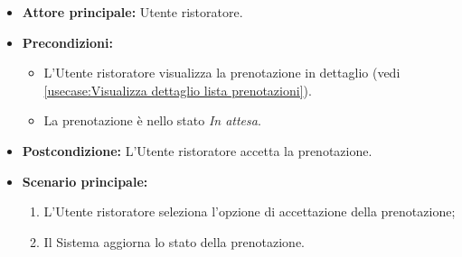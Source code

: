 \label{usecase:Accetta prenotazione}
\begin{itemize}
	\item \textbf{Attore principale:} Utente ristoratore.

	\item \textbf{Precondizioni:}
	      \begin{itemize}
		      \item L'Utente ristoratore visualizza la prenotazione in dettaglio (vedi \autoref{usecase:Visualizza dettaglio lista prenotazioni}).

		      \item La prenotazione è nello stato \textit{In attesa}.
	      \end{itemize}

	\item \textbf{Postcondizione:} L'Utente ristoratore accetta la prenotazione.


	\item \textbf{Scenario principale:}
	      \begin{enumerate}
		      \item L'Utente ristoratore seleziona l'opzione di accettazione della prenotazione;

		      \item Il Sistema aggiorna lo stato della prenotazione.
	      \end{enumerate}
\end{itemize}
